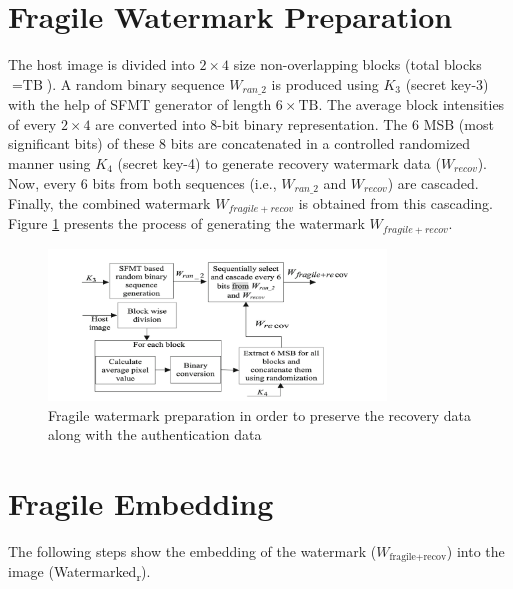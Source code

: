 \documentclass{article}
\begin{document}
\section{Fragile Watermark Preparation}

The host image is divided into $2 \times 4$ size non-overlapping blocks (total blocks $= \text{TB}$). A random binary sequence $W_{ran\_2}$ is produced using $K_3$ (secret key-3) with the help of SFMT generator of length $6 \times \text{TB}$. The average block intensities of every $2 \times 4$ are converted into 8-bit binary representation. The 6 MSB (most significant bits) of these 8 bits are concatenated in a controlled randomized manner using $K_4$ (secret key-4) to generate recovery watermark data ($W_{recov}$). Now, every 6 bits from both sequences (i.e., $W_{ran\_2}$ and $W_{recov}$) are cascaded. Finally, the combined watermark $W_{fragile+recov}$ is obtained from this cascading. Figure \ref{fig:preparation} presents the process of generating the watermark $W_{fragile+recov}$.

\begin{figure}[h]
    \centering
    \includegraphics[width=0.8\textwidth]{watermark_preparation_process.png}
    \caption{Fragile watermark preparation in order to preserve the recovery data along with the authentication data}
    \label{fig:preparation}
\end{figure}

\section{Fragile Embedding}

The following steps show the embedding of the watermark ($W_{\text{fragile+recov}}$) into the image (Watermarked\textsubscript{r}).
\end{document}
